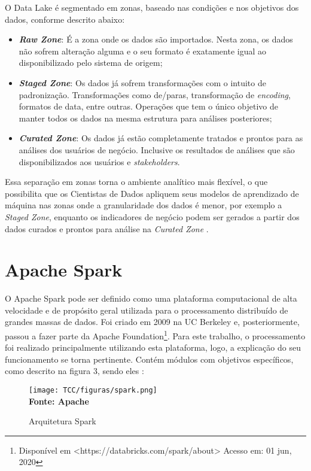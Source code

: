 O Data Lake é segmentado em zonas, baseado nas condições e nos objetivos dos dados, conforme descrito abaixo:

\begin{itemize}
 \item \textbf{\textit{Raw Zone}}: É a zona onde os dados são importados. Nesta zona, os dados não sofrem alteração alguma e o seu formato é exatamente igual ao disponibilizado pelo sistema de origem; 
 \item \textbf{\textit{Staged Zone}}: Os dados já sofrem transformações com o intuito de padronização. Transformações como de/paras, transformação de \textit{encoding}, formatos de data, entre outras. Operações que tem o único objetivo de manter todos os dados na mesma estrutura para análises posteriores;
 \item \textbf{\textit{Curated Zone}}: Os dados já estão completamente tratados e prontos para as análises dos usuários de negócio. Inclusive os resultados de análises que são disponibilizados aos usuários e \textit{stakeholders}.
 \end{itemize}
 
 Essa separação em zonas torna o ambiente analítico mais flexível, o que possibilita que os Cientistas de Dados apliquem seus modelos de aprendizado de máquina nas zonas onde a granularidade dos dados é menor, por exemplo a \textit{Staged Zone}, enquanto os indicadores de negócio podem ser gerados a partir dos dados curados e prontos para análise na \textit{Curated Zone} \cite{datalakeforenterprises}.

\section{Apache Spark} O Apache Spark pode ser definido como uma plataforma computacional de alta velocidade e de propósito geral utilizada para o processamento distribuído de grandes massas de dados. Foi criado em 2009 na UC Berkeley e, posteriormente, passou a fazer parte da Apache Foundation\footnote{Disponível em <https://databricks.com/spark/about> Acesso em: 01 jun, 2020}. Para este trabalho, o processamento foi realizado principalmente utilizando esta plataforma, logo, a explicação do seu funcionamento se torna pertinente. Contém módulos com objetivos específicos, como descrito na figura 3, sendo eles \cite{learningspark}:

\begin{figure}[H]
	\centering	
	\caption[\hspace{0.1cm} Spark]{Arquitetura Spark}
	  \vspace{-0.4cm}
	\texttt{[image: TCC/figuras/spark.png]}
	 \vspace{-0.3cm}
	\\\textbf{\footnotesize Fonte: Apache}
	\label{fig:tela1}
\end{figure}

